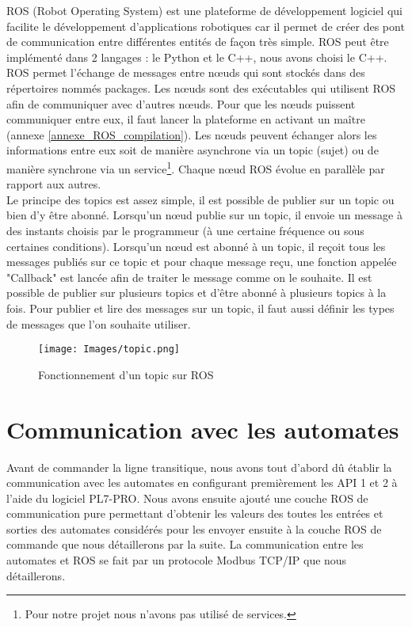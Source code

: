 \documentclass[a4paper,french, titlepage]{book}
\begin{document}
ROS (Robot Operating System) est une plateforme de développement logiciel qui facilite le développement d'applications robotiques car il permet de créer des pont de communication entre différentes entités de façon très simple. ROS peut être implémenté dans 2 langages : le Python et le C++, nous avons choisi le C++.\\

ROS permet l'échange de messages entre nœuds qui sont stockés dans des répertoires nommés packages. Les nœuds sont des exécutables qui utilisent ROS afin de communiquer avec d'autres nœuds. Pour que les nœuds puissent communiquer entre eux, il faut lancer la plateforme en activant un maître (annexe \ref{annexe_ROS_compilation}). Les nœuds peuvent échanger alors les informations entre eux soit de manière asynchrone via un topic (sujet) ou de manière synchrone via un service\footnote{Pour notre projet nous n'avons pas utilisé de services.}. Chaque nœud ROS évolue en parallèle par rapport aux autres.\\

Le principe des topics est assez simple, il est possible de publier sur un topic ou bien d'y être abonné. Lorsqu'un nœud publie sur un topic, il envoie un message à des instants choisis par le programmeur (à une certaine fréquence ou sous certaines conditions). Lorsqu'un nœud est abonné à un topic, il reçoit tous les messages publiés sur ce topic et pour chaque message reçu, une fonction appelée "Callback" est lancée afin de traiter le message comme on le souhaite. Il est possible de publier sur plusieurs topics et d'être abonné à plusieurs topics à la fois. Pour publier et lire des messages sur un topic, il faut aussi définir les types de messages que l'on souhaite utiliser.


\begin{figure}[H] 
\begin{center}
\texttt{[image: Images/topic.png]} 
\end{center}
\caption{Fonctionnement d'un topic sur ROS}
\label{topic}
\end{figure} 


\newpage

\chapter{Communication avec les automates}

Avant de commander la ligne transitique, nous avons tout d'abord dû établir la communication avec les automates en configurant premièrement les API 1 et 2 à l'aide du logiciel PL7-PRO. Nous avons ensuite ajouté une couche ROS de communication pure permettant d'obtenir les valeurs des toutes les entrées et sorties des automates considérés pour les envoyer ensuite à la couche ROS de commande que nous détaillerons par la suite. La communication entre les automates et ROS se fait par un protocole Modbus TCP/IP que nous détaillerons.
\end{document}
